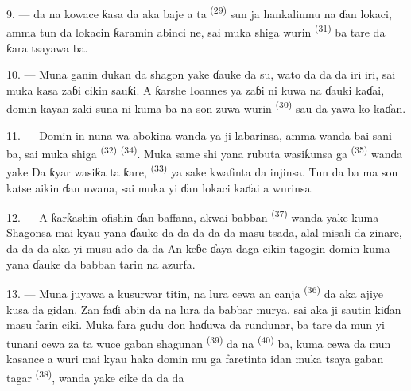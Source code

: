 \VUsaut{3.0mm}

9. ---  da  na kowace ƙasa
da aka baje a  ta 
\textsuperscript{(29)} sun ja hankalinmu na ɗan lokaci, amma tun da
lokacin ƙaramin abinci ne, sai muka shiga wurin 
\textsuperscript{(31)} ba tare da ƙara tsayawa ba.

10. --- Muna ganin dukan  da shagon yake ɗauke da
su, wato  da  da  da
 iri iri, sai muka kasa zaɓi cikin sauƙi. A ƙarshe
Ioannes ya zaɓi  ni kuwa na ɗauki  kaɗai, domin kayan zaki suna 
ni kuma ba na son zuwa wurin 
\textsuperscript{(30)} sau da yawa ko kaɗan.

\VUsaut{3.0mm}

11. --- Domin in nuna wa abokina  wanda ya ji
labarinsa, amma wanda bai sani ba, sai muka shiga 
\textsuperscript{(32)}  \textsuperscript{(34)}. Muka same
shi yana rubuta wasiƙunsa ga  \textsuperscript{(35)}
wanda yake  Da ƙyar wasiƙa ta ƙare,
 \textsuperscript{(33)} ya sake kwafinta da injinsa.
Tun da ba ma son katse aikin ɗan uwana, sai muka yi ɗan lokaci kaɗai a
wurinsa.

12. --- A ƙarƙashin ofishin ɗan baffana, akwai babban  \textsuperscript{(37)} wanda yake kuma
 Shagonsa mai kyau yana ɗauke da
 da  da 
da  da  masu tsada, alal misali
 da  zinare, da  da  da aka yi musu ado da  da  An keɓe ɗaya daga cikin
tagogin domin  kuma yana ɗauke da babban tarin
 na azurfa.

13. --- Muna juyawa a kusurwar titin, na lura cewa an canja
 \textsuperscript{(36)} da aka ajiye kusa da
 gidan. Zan faɗi abin da na lura da babbar murya, sai
aka ji sautin kiɗan  masu farin ciki. Muka fara gudu don
haɗuwa da rundunar, ba tare da mun yi tunani cewa  za ta
wuce gaban shagunan  \textsuperscript{(39)} da
na  \textsuperscript{(40)} ba, kuma cewa
da mun kasance a wuri mai kyau haka domin mu ga faretinta idan muka
tsaya gaban tagar  \textsuperscript{(38)},
wanda yake cike da  da  da 

